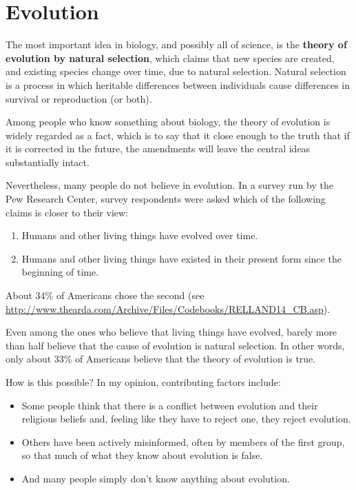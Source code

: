 \documentclass[12pt]{book}
\theoremstyle{exercise}
\begin{document}
\chapter{Evolution}

The most important idea in biology, and possibly all of science, is the {\bf theory of evolution by natural selection}, which claims that new species are created, and existing species change over time, due to natural selection.  Natural selection is a process in which heritable differences between individuals cause differences in survival or reproduction (or both).

Among people who know something about biology, the theory of evolution is widely regarded as a fact, which is to say that it close enough to the truth that if it is corrected in the future, the amendments will leave the central ideas substantially intact.

Nevertheless, many people do not believe in evolution.  In a survey run by the Pew Research Center, survey respondents were asked which of the following claims is closer to their view:

\begin{enumerate}

\item Humans and other living things have evolved over time.

\item Humans and other living things have existed in their present form since the beginning of time.

\end{enumerate}

About 34\% of Americans chose the second (see \url{http://www.thearda.com/Archive/Files/Codebooks/RELLAND14_CB.asp}).

Even among the ones who believe that living things have evolved, barely more than half believe that the cause of evolution is natural selection.  In other words, only about 33\% of Americans believe that the theory of evolution is true.

How is this possible?  In my opinion, contributing factors include:

\begin{itemize}

\item Some people think that there is a conflict between evolution and their religious beliefs and, feeling like they have to reject one, they reject evolution.

\item Others have been actively misinformed, often by members of the first group, so that much of what they know about evolution is false.

\item And many people simply don't know anything about evolution.

\end{itemize}
\end{document}
